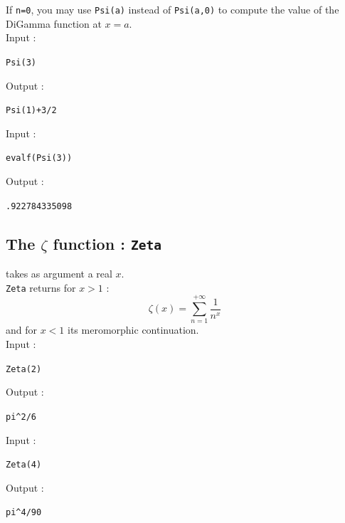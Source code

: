 \documentclass[a4paper,11pt]{book}
\begin{document}
If {\tt n=0}, you may use {\tt Psi(a)} instead of {\tt Psi(a,0)} 
to compute the value of the DiGamma function at $x=a$.\\ 
Input :
\begin{center}{\tt Psi(3)}\end{center}
Output :
\begin{center}{\tt  Psi(1)+3/2}\end{center}
Input :
\begin{center}{\tt evalf(Psi(3))}\end{center}
Output :
\begin{center}{\tt  .922784335098}\end{center}

\subsection{The $\zeta$ function : {\tt Zeta}}
 takes as argument a real $x$.\\ 
{\tt Zeta} returns for $x>1$ : 
\[ \zeta(x)= \sum_{n=1}^{+\infty} \frac{1}{n^x} \]
and for $x<1$ its meromorphic continuation.\\
Input :
\begin{center}{\tt Zeta(2)}\end{center}
Output :
\begin{center}{\tt pi\verb|^|2/6}\end{center}
Input :
\begin{center}{\tt Zeta(4)}\end{center}
Output :
\begin{center}{\tt pi\verb|^|4/90}\end{center}
\end{document}
